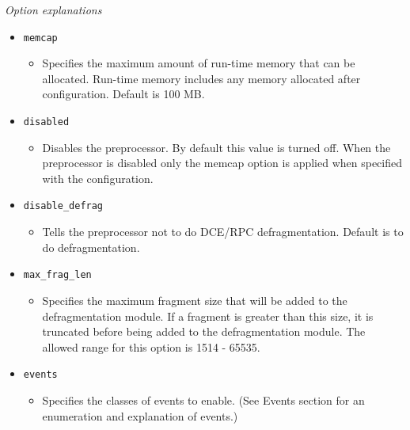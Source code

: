 \documentclass[english]{report}
\begin{document}
\textit{Option explanations}
\begin{itemize}
\item[] \texttt{memcap}
\begin{itemize}

\item[] Specifies the maximum amount of run-time memory that can be allocated.
Run-time memory includes any memory allocated after configuration.  Default is
100 MB.

\end{itemize}

\item[] \texttt{disabled}
\begin{itemize}

\item[] Disables the preprocessor. By default this value is turned off. When the 
preprocessor is disabled only the memcap option is applied when specified 
with the configuration.

\end{itemize}

\item[] \texttt{disable\_defrag}

\begin{itemize}

\item[] Tells the preprocessor not to do DCE/RPC defragmentation.  Default is
to do defragmentation.

\end{itemize}

\item[] \texttt{max\_frag\_len}

\begin{itemize}

\item[] Specifies the maximum fragment size that will be added to the
defragmentation module. If a fragment is greater than this size, it is truncated
before being added to the defragmentation module.  The allowed range for this
option is 1514 - 65535.

\end{itemize}

\item[] \texttt{events}

\begin{itemize}

\item[] Specifies the classes of events to enable.  (See Events section for an
enumeration and explanation of events.)


\end{itemize}
\end{itemize}
\end{document}

